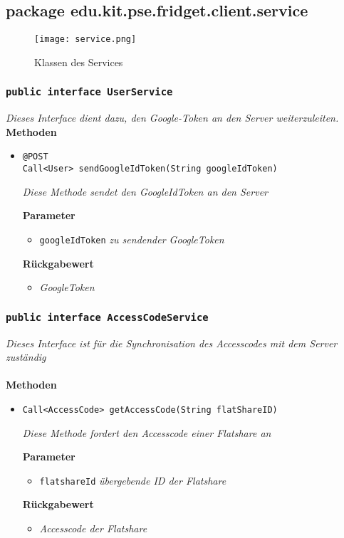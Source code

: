 
\subsection{package edu.kit.pse.fridget.client.service}
\begin{figure}[H]
	       \centering
	       \texttt{[image: service.png]}
	       \caption{Klassen des Services}
	      \end{figure}	
	\subsubsection{\texttt{public interface UserService}}
\textit{Dieses Interface dient dazu, den Google-Token an den Server weiterzuleiten.}\\

	\textbf{Methoden}
		\begin{itemize}

      \item\texttt{{@POST\\ Call<User> sendGoogleIdToken(String googleIdToken)}}

		\textit{Diese Methode sendet den GoogleIdToken an den Server}

		\textbf{Parameter}
		\begin{itemize}
			\item\texttt{googleIdToken}
			\textit{zu sendender GoogleToken}
		\end{itemize}
	
		\textbf{Rückgabewert}
		\begin{itemize}
			\item\textit{GoogleToken}
		\end{itemize}		
	

	 \end{itemize}

	\subsubsection{\texttt{public interface AccessCodeService}}
\textit{Dieses Interface ist für die Synchronisation des Accesscodes mit dem Server zuständig }\\
\\
	\textbf{Methoden}
		\begin{itemize}
		\item\texttt{{Call<AccessCode> getAccessCode(String flatShareID)}}

		\textit{Diese Methode fordert den Accesscode einer Flatshare an}

		\textbf{Parameter}
		\begin{itemize}
			\item\texttt{flatshareId}
			\textit {übergebende ID der Flatshare}
		 \end{itemize}
		 
		\textbf{Rückgabewert} 
		\begin{itemize}
		\item\textit{Accesscode der Flatshare}
		\end{itemize}

	 \end{itemize}

